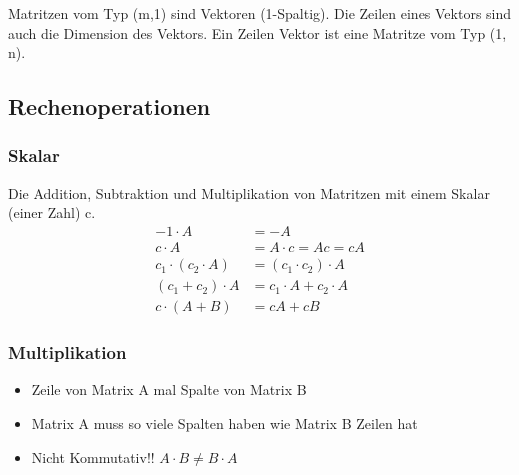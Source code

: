 \documentclass[german]{latex4ei/latex4ei_sheet}
\begin{document}
\begin{sectionbox}
Matritzen vom Typ (m,1) sind Vektoren (1-Spaltig). Die Zeilen eines Vektors sind auch die Dimension des Vektors. Ein Zeilen Vektor ist eine Matritze vom Typ (1, n).

\subsection{Rechenoperationen}
\subsubsection{Skalar}
Die Addition, Subtraktion und Multiplikation von Matritzen mit einem Skalar (einer Zahl) c.
\begin{align*}
-1 \cdot A &= -A \\ 
c \cdot A &= A \cdot c = Ac = cA \\
{c}_{1} \cdot \left( {c}_{2} \cdot A \right) &= \left( {c}_{1} \cdot {c}_{2} \right) \cdot A \\\left({c}_{1} + {c}_{2} \right) \cdot A &= {c}_{1} \cdot A + {c}_{2} \cdot A \\
c \cdot \left(A + B \right) &= cA + cB 
\end{align*}

\subsubsection{Multiplikation}
\begin{itemize}
\item Zeile von Matrix A mal Spalte von Matrix B 
\item Matrix A muss so viele Spalten haben wie Matrix B Zeilen hat 
\item Nicht Kommutativ!! $A \cdot B \neq B \cdot A$
\end{itemize}

\end{sectionbox}
\end{document}
